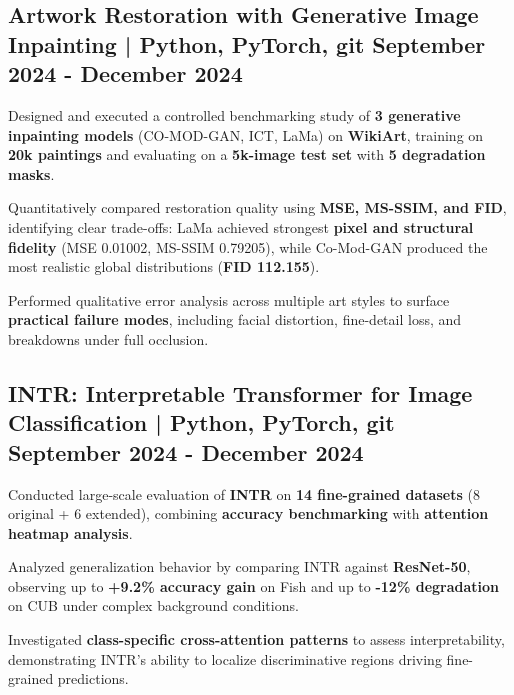 
\subsection{{Artwork Restoration with Generative Image Inpainting | Python, PyTorch, git  \hfill September 2024 - December 2024}}
\begin{zitemize}
    \item Designed and executed a controlled benchmarking study of \textbf{3 generative inpainting models} (CO-MOD-GAN, ICT, LaMa) on \textbf{WikiArt}, training on \textbf{20k paintings} and evaluating on a \textbf{5k-image test set} with \textbf{5 degradation masks}.

    \item Quantitatively compared restoration quality using \textbf{MSE, MS-SSIM, and FID}, identifying clear trade-offs: LaMa achieved strongest \textbf{pixel and structural fidelity} (MSE 0.01002, MS-SSIM 0.79205), while Co-Mod-GAN produced the most realistic global distributions (\textbf{FID 112.155}).

    \item Performed qualitative error analysis across multiple art styles to surface \textbf{practical failure modes}, including facial distortion, fine-detail loss, and breakdowns under full occlusion.
\end{zitemize}



\subsection{{INTR: Interpretable Transformer for Image Classification | Python, PyTorch, git  \hfill September 2024 - December 2024}}
\begin{zitemize}
    \item Conducted large-scale evaluation of \textbf{INTR} on \textbf{14 fine-grained datasets} (8 original + 6 extended), combining \textbf{accuracy benchmarking} with \textbf{attention heatmap analysis}.

    \item Analyzed generalization behavior by comparing INTR against \textbf{ResNet-50}, observing up to \textbf{+9.2\% accuracy gain} on Fish and up to \textbf{-12\% degradation} on CUB under complex background conditions.

    \item Investigated \textbf{class-specific cross-attention patterns} to assess interpretability, demonstrating INTR’s ability to localize discriminative regions driving fine-grained predictions.
\end{zitemize}



